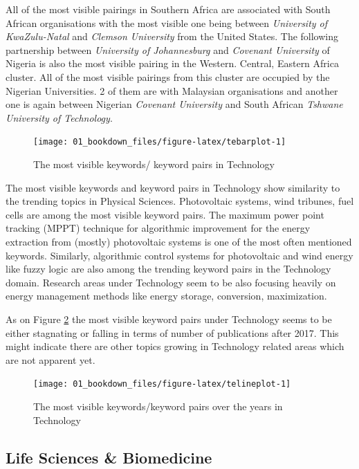 \documentclass[
]{book}
\begin{document}
All of the most visible pairings in Southern Africa are associated with South African organisations with the most visible one being between \emph{University of KwaZulu-Natal} and \emph{Clemson University} from the United States. The following partnership between \emph{University of Johannesburg} and \emph{Covenant University} of Nigeria is also the most visible pairing in the Western. Central, Eastern Africa cluster. All of the most visible pairings from this cluster are occupied by the Nigerian Universities. 2 of them are with Malaysian organisations and another one is again between Nigerian \emph{Covenant University} and South African \emph{Tshwane University of Technology}.

\begin{figure}
\texttt{[image: 01\_bookdown\_files/figure-latex/tebarplot-1]} \caption{The most visible keywords/ keyword pairs in Technology}\label{fig:tebarplot}
\end{figure}

The most visible keywords and keyword pairs in Technology show similarity to the trending topics in Physical Sciences. Photovoltaic systems, wind tribunes, fuel cells are among the most visible keyword pairs. The maximum power point tracking (MPPT) technique for algorithmic improvement for the energy extraction from (mostly) photovoltaic systems is one of the most often mentioned keywords. Similarly, algorithmic control systems for photovoltaic and wind energy like fuzzy logic are also among the trending keyword pairs in the Technology domain. Research areas under Technology seem to be also focusing heavily on energy management methods like energy storage, conversion, maximization.

As on Figure \ref{fig:telineplot} the most visible keyword pairs under Technology seems to be either stagnating or falling in terms of number of publications after 2017. This might indicate there are other topics growing in Technology related areas which are not apparent yet.

\begin{figure}
\texttt{[image: 01\_bookdown\_files/figure-latex/telineplot-1]} \caption{The most visible keywords/keyword pairs over the years in Technology}\label{fig:telineplot}
\end{figure}

\hypertarget{life-sciences-biomedicine}{%
\subsection{Life Sciences \& Biomedicine}\label{life-sciences-biomedicine}}
\end{document}
